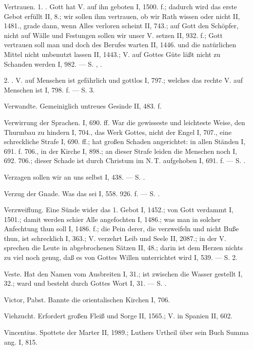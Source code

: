 Vertrauen. 1. . Gott hat V. auf ihn geboten I, 1500. f.; dadurch wird das erste Gebot erfüllt II, 8.; wir sollen ihm vertrauen, ob wir Rath wissen oder nicht II, 1481., grade dann, wenn Alles verloren scheint II, 743.; auf Gott den Schöpfer, nicht auf Wälle und Festungen sollen wir unser V. setzen II, 932. f.; Gott vertrauen soll man und doch des Berufes warten II, 1446. und die natürlichen Mittel nicht unbenutzt lassen II, 1443.; V. auf Gottes Güte läßt nicht zu Schanden werden I, 982. — S. , .

2. . V. auf Menschen ist gefährlich und gottlos I, 797.; welches das rechte V. auf Menschen ist I, 798. f. — S.  3.

Verwandte. Gemeiniglich untreues Gesinde II, 483. f.

Verwirrung der Sprachen. I, 690. ff. War die gewisseste und leichteste Weise, den Thurmbau zu hindern I, 704., das Werk Gottes, nicht der Engel I, 707., eine schreckliche Strafe I, 690. ff.; hat großen Schaden angerichtet: in allen Ständen I, 691. f. 706., in der Kirche I, 898.; an dieser Strafe leiden die Menschen noch I, 692. 706.; dieser Schade ist durch Christum im N.\,T. aufgehoben I, 691. f. — S. .

Verzagen sollen wir an uns selbst I, 438. — S. .

Verzug der Gnade. Was das sei I, 558. 926. f. — S. .

Verzweiflung. Eine Sünde wider das 1. Gebot I, 1452.; von Gott verdammt I, 1501.; damit werden schier Alle angefochten I, 1486.; was man in solcher Anfechtung thun soll I, 1486. f.; die Pein derer, die verzweifeln und nicht Buße thun, ist schrecklich I, 363.; V. verzehrt Leib und Seele II, 2087.; in der V. sprechen die Leute in abgebrochenen Sätzen II, 48.; darin ist dem Herzen nichts zu viel noch genug, daß es von Gottes Willen unterrichtet wird I, 539. — S.  2.

Veste. Hat den Namen vom Ausbreiten I, 31.; ist zwischen die Wasser gestellt I, 32.; ward und besteht durch Gottes Wort I, 31. — S. .

Victor, Pabst. Bannte die orientalischen Kirchen I, 706.

Viehzucht. Erfordert großen Fleiß und Sorge II, 1565.; V. in Spanien II, 602.

Vincentius. Spottete der Marter II, 1989.; Luthers Urtheil über sein Buch Summa ang. I, 815.

